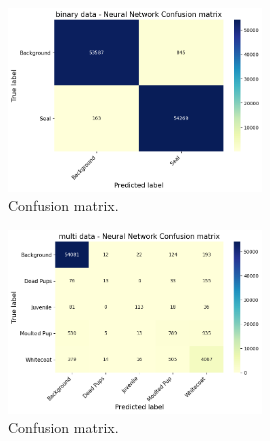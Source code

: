 \documentclass[letterpaper,12pt]{article}
\begin{document}
\begin{appendices}
\begin{figure}[h]
\centerline{\includegraphics[width=0.6\textwidth]{report/figures/binary_mlp_class_distribution.png}}
\caption{\label{fig:binary_mlp_class_distribution}Confusion matrix.}
\end{figure}

\begin{figure}[h]
\centerline{\includegraphics[width=0.6\textwidth]{report/figures/multi_mlp_class_distribution.png}}
\caption{\label{fig:multi_mlp_class_distribution}Confusion matrix.}
\end{figure}

\end{appendices}
\end{document}
